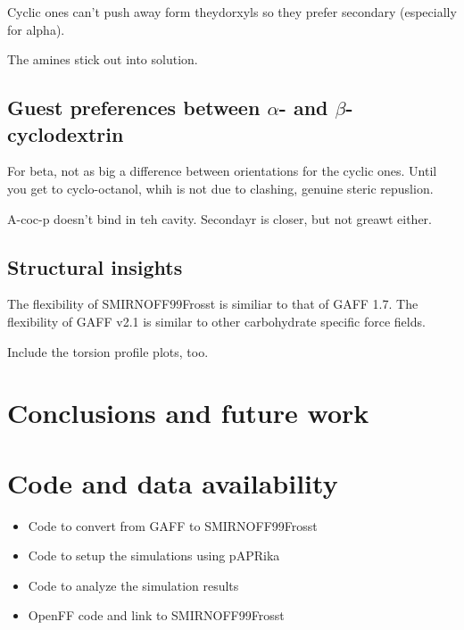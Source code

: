 \documentclass[9pt,lineno]{elife}
\begin{document}
Cyclic ones can’t push away form theydorxyls so they prefer secondary (especially for alpha).

The amines stick out into solution.


\subsection{Guest preferences between $\alpha$- and $\beta$-cyclodextrin}

For beta, not as big a difference between orientations for the cyclic ones. Until you get to cyclo-octanol, whih is not due to clashing, genuine steric repuslion.

A-coc-p doesn’t bind in teh cavity. Secondayr is closer, but not greawt either.



\subsection{Structural insights}

The flexibility of SMIRNOFF99Frosst is similiar to that of GAFF 1.7.
The flexibility of GAFF v2.1 is similar to other carbohydrate specific force fields.

Include the torsion profile plots, too.

\section{Conclusions and future work}


\section{Code and data availability}
\begin{itemize}
	\item Code to convert from GAFF to SMIRNOFF99Frosst
	\item Code to setup the simulations using pAPRika
	\item Code to analyze the simulation results
	\item OpenFF code and link to SMIRNOFF99Frosst
\end{itemize}
\end{document}
